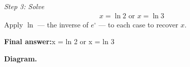 \documentclass[11pt]{article}
\begin{document}
\textit{Step 3: Solve}
\[\begin{gathered}
x = \ln 2 \text{ or } x = \ln 3
\end{gathered}\]
Apply \( \ln \) --- the inverse of \( e^{\square} \) --- to each case to recover \( x \).

\begin{answerbox}
\textbf{Final answer:}\quad x = ln 2 or x = ln 3
\end{answerbox}
\textbf{Diagram.}

\begin{center}
\end{center}
\end{document}
